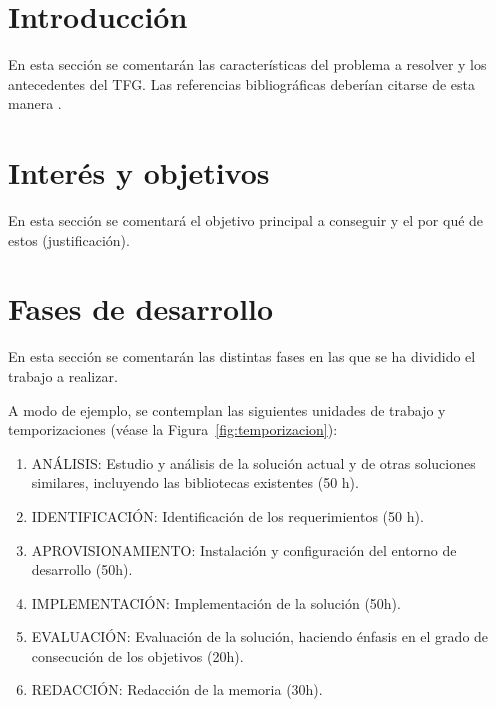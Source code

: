 \documentclass[titlepage, 12pt, a4paper, oneside]{article}
\begin{document}
\normalsize

\section{Introducción}
En esta sección se comentarán las características del problema a resolver y los antecedentes del TFG. Las referencias bibliográficas deberían citarse de esta manera \cite{einstein1922kosmologische}.

\section{Interés y objetivos}
En esta sección se comentará el objetivo principal a conseguir y el por qué de estos (justificación).

\section{Fases de desarrollo}
En esta sección se comentarán las distintas fases en las que se ha
dividido el trabajo a realizar.

A modo de ejemplo, se contemplan las siguientes unidades de trabajo y
temporizaciones (véase la Figura~\ref{fig:temporizacion}):
\begin{enumerate}
  \item {ANÁLISIS:} Estudio y análisis de la solución actual y de
    otras soluciones similares, incluyendo las bibliotecas existentes
    (50 h).
  \item {IDENTIFICACIÓN}: Identificación de los requerimientos (50 h).
  \item {APROVISIONAMIENTO}: Instalación y configuración del entorno
    de desarrollo (50h).
  \item {IMPLEMENTACIÓN}: Implementación de la solución (50h).
  \item {EVALUACIÓN}: Evaluación de la solución, haciendo énfasis en
    el grado de consecución de los objetivos (20h).
  \item {REDACCIÓN}: Redacción de la memoria (30h).
\end{enumerate}
\end{document}
